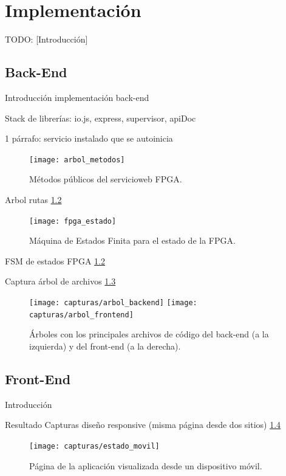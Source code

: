 \chapter{Implementación\label{cap:implementacion}}

TODO: [Introducción]


\section{Back-End\label{sec:imp:back_end}}

Introducción implementación back-end

Stack de librerías: io.js, express, supervisor, apiDoc

1 párrafo: servicio instalado que se autoinicia

\begin{figure}[!htp]
  \centering
  \texttt{[image: arbol\_metodos]}
  \caption{Métodos públicos del \gls{servicioweb} \gls{FPGA}.}
  \label{fig:arbol_metodos}
\end{figure}

Arbol rutas \ref{fig:fpga_estado}

\begin{figure}[!htp]
  \centering
  \texttt{[image: fpga\_estado]}
  \caption{Máquina de Estados Finita para el estado de la \gls{FPGA}.}
  \label{fig:fpga_estado}
\end{figure}

FSM de estados FPGA \ref{fig:fpga_estado}

Captura árbol de archivos \ref{fig:arbol_codigo}

\begin{figure}[!htp]
  \begin{center}
    \texttt{[image: capturas/arbol\_backend]}
    \hspace{1cm}
    \texttt{[image: capturas/arbol\_frontend]}
  \caption{Árboles con los principales archivos de código del \gls{back-end} (a la izquierda) y del \gls{front-end} (a la derecha).}
  \label{fig:arbol_codigo}
  \end{center}
\end{figure}


\section{Front-End\label{sec:imp:front_end}}

Introducción

Resultado Capturas diseño responsive (misma página desde dos sitios) \ref{fig:captura:movil}
\begin{figure}[!htp]
  \centering
  \texttt{[image: capturas/estado\_movil]}
  \caption{Página de la aplicación visualizada desde un dispositivo móvil.}
  \label{fig:captura:movil}
\end{figure}

